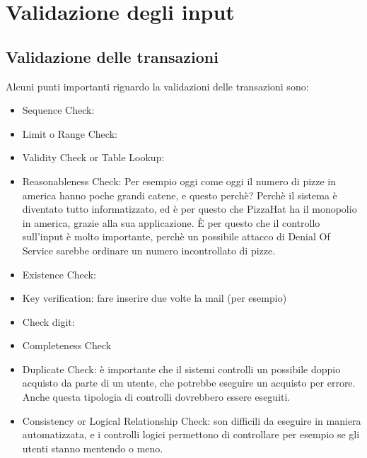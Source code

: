 \chapter{Validazione degli input}

\section{Validazione delle transazioni}

Alcuni punti importanti riguardo la validazioni delle transazioni sono:
\begin{itemize}
\item Sequence Check:
\item Limit o Range Check:
\item Validity Check or Table Lookup:
\item Reasonableness Check: 
Per esempio oggi come oggi il numero di pizze in america hanno poche grandi 
catene, e questo perchè? Perchè il sistema è diventato tutto informatizzato, ed 
è per questo che PizzaHat ha il monopolio in america, grazie alla sua 
applicazione. È per questo che il controllo sull'input è molto importante, 
perchè un possibile attacco di Denial Of Service sarebbe ordinare un numero 
incontrollato di pizze.
\item Existence Check:
\item Key verification: fare inserire due volte la mail (per esempio)
\item Check digit:
\item Completeness Check
\item Duplicate Check: è importante che il sistemi controlli un possibile doppio 
acquisto da parte di un utente, che potrebbe eseguire un acquisto per errore. 
Anche questa tipologia di controlli dovrebbero essere eseguiti.
\item Consistency or Logical Relationship Check: son difficili da eseguire in 
maniera automatizzata, e i controlli logici permettono di controllare per 
esempio se gli utenti stanno mentendo o meno. 
\end{itemize}

